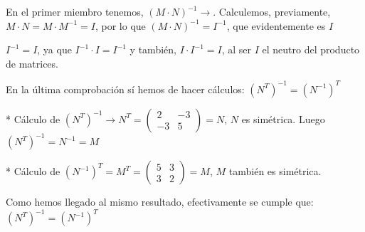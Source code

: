 \begin{proofw}
En el primer miembro tenemos, $(M\cdot N)^{-1}\to $. Calculemos, previamente, $M\cdot N=M \cdot M^{-1} =I$, por lo que $(M\cdot N)^{-1}=I^{-1} $, que evidentemente es $I$

\noindent \small{\textcolor{gris}{$I^{-1} =I$, ya que $I^{-1} \cdot I = I^{-1}$ y también, $I\cdot I^{-1}=I$, al ser $I$ el neutro del producto de matrices}}\normalsize{.}

\noindent En la última comprobación sí hemos de hacer cálculos: $(N^T)^{-1}=(N^{-1})^T$

* Cálculo de $(N^T)^{-1} \to N^T=\left( \begin{matrix} 2&-3\\-3&5 \end{matrix} \right) = N$, $N$ es simétrica. Luego $(N^T)^{-1}=N^{-1}=M$

* Cálculo de $(N^{-1})^T=M^T=\left( \begin{matrix} 5&3\\3&2 \end{matrix} \right)=M$, $M$ también es simétrica.

Como hemos llegado al mismo resultado, efectivamente se cumple que: $(N^T)^{-1}=(N^{-1})^T$

\end{proofw}

